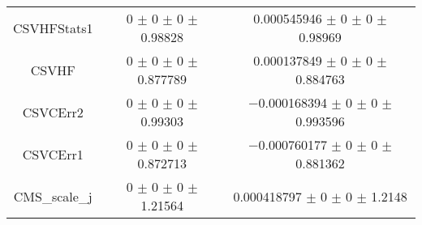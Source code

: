 \begin{table}
\begin{tabular}{ccc}
CSVHFStats1 	& \num{0} $\pm$ \num{0} $\pm$ \num{0} $\pm$ \num{0.98828} 	& \num{0.000545946} $\pm$ \num{0} $\pm$ \num{0} $\pm$ \num{0.98969}\\
CSVHF 	& \num{0} $\pm$ \num{0} $\pm$ \num{0} $\pm$ \num{0.877789} 	& \num{0.000137849} $\pm$ \num{0} $\pm$ \num{0} $\pm$ \num{0.884763}\\
CSVCErr2 	& \num{0} $\pm$ \num{0} $\pm$ \num{0} $\pm$ \num{0.99303} 	& \num{-0.000168394} $\pm$ \num{0} $\pm$ \num{0} $\pm$ \num{0.993596}\\
CSVCErr1 	& \num{0} $\pm$ \num{0} $\pm$ \num{0} $\pm$ \num{0.872713} 	& \num{-0.000760177} $\pm$ \num{0} $\pm$ \num{0} $\pm$ \num{0.881362}\\
CMS\_scale\_j 	& \num{0} $\pm$ \num{0} $\pm$ \num{0} $\pm$ \num{1.21564} 	& \num{0.000418797} $\pm$ \num{0} $\pm$ \num{0} $\pm$ \num{1.2148}\\
\bottomrule
\end{tabular}
\end{table}